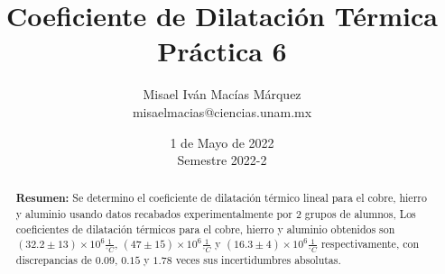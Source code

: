 \documentclass[DIV=calc, paper=a4, fontsize=11pt]{scrartcl}
\title{Coeficiente de Dilatación Térmica\\ %
Práctica 6} %
\author{Misael Iván Macías Márquez\\
misaelmacias@ciencias.unam.mx}
\date{1 de Mayo de 2022\\Semestre 2022-2}
\begin{document}
\maketitle


\begin{abstract}
\textbf{Resumen:} Se determino el coeficiente de dilatación térmico lineal para el cobre, hierro y aluminio usando datos recabados experimentalmente por 2 grupos de alumnos, Los coeficientes de dilatación térmicos para el cobre, hierro y aluminio obtenidos son $(32.2 \pm 13) \times 10^{6}\frac{1}{^{\circ}C}$, $(47 \pm 15) \times 10^{6} \frac{1}{^{\circ}C}$ y $(16.3 \pm 4) \times 10^{6} \frac{1}{^{\circ}C}$ respectivamente, con discrepancias de $0.09$, $0.15$ y $1.78$ veces sus incertidumbres absolutas.
\end{abstract}
\end{document}
